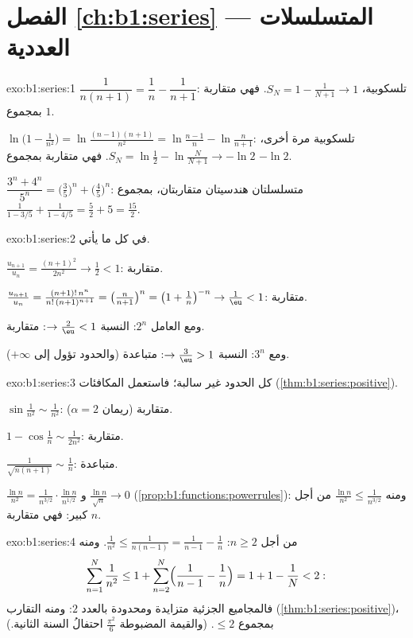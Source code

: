 \section*{الفصل \ref{ch:b1:series} --- المتسلسلات العددية}

\begin{solution}{exo:b1:series:1}
$\dfrac{1}{n(n+1)} = \dfrac1n - \dfrac{1}{n+1}$: تلسكوبية، $S_N =
1 - \frac{1}{N+1} \to 1$. فهي متقاربة بمجموع $1$.

$\ln\bigl(1 - \frac{1}{n^2}\bigr) = \ln\frac{(n-1)(n+1)}{n^2} =
\ln\frac{n-1}{n} - \ln\frac{n}{n+1}$: تلسكوبية مرة أخرى، $S_N =
\ln\frac12 - \ln\frac{N}{N+1} \to -\ln 2$. فهي متقاربة بمجموع $-\ln 2$.

$\dfrac{3^n + 4^n}{5^n} = \bigl(\frac35\bigr)^n +
\bigl(\frac45\bigr)^n$: متسلسلتان هندسيتان متقاربتان، بمجموع
$\frac{1}{1 - 3/5} + \frac{1}{1 - 4/5} = \frac52 + 5 = \frac{15}{2}$.
\end{solution}

\begin{solution}{exo:b1:series:2}
 في كل ما يأتي.

$\frac{u_{n+1}}{u_n} = \frac{(n+1)^2}{2n^2} \to \frac12 < 1$:
متقاربة.

$\frac{u_{n+1}}{u_n} = \frac{(n+1)!\,n^n}{n!\,(n+1)^{n+1}} =
\bigl(\frac{n}{n+1}\bigr)^n = \bigl(1 + \frac1n\bigr)^{-n} \to
\frac1\eu < 1$: متقاربة.

ومع العامل $2^n$: النسبة $\to \frac2\eu < 1$: متقاربة.

ومع $3^n$: النسبة $\to \frac3\eu > 1$: متباعدة (والحدود تؤول إلى
$+\infty$).
\end{solution}

\begin{solution}{exo:b1:series:3}
كل الحدود غير سالبة؛ فاستعمل المكافئات
(\cref{thm:b1:series:positive}).

$\sin\frac{1}{n^2} \sim \frac{1}{n^2}$: متقاربة (ريمان $\alpha
= 2$).

$1 - \cos\frac1n \sim \frac{1}{2n^2}$: متقاربة.

$\frac{1}{\sqrt{n(n+1)}} \sim \frac1n$: متباعدة.

$\frac{\ln n}{n^2} = \frac{1}{n^{3/2}}\cdot\frac{\ln n}{n^{1/2}}$
و $\frac{\ln n}{\sqrt n} \to 0$
(\cref{prop:b1:functions:powerrules}): ومنه $\frac{\ln n}{n^2} \leq
\frac{1}{n^{3/2}}$ من أجل $n$ كبير: فهي متقاربة.
\end{solution}

\begin{solution}{exo:b1:series:4}
من أجل $n \geq 2$: $\frac{1}{n^2} \leq \frac{1}{n(n-1)} =
\frac{1}{n-1} - \frac1n$. ومنه
\[
\sum_{n=1}^{N} \frac{1}{n^2} \leq 1 + \sum_{n=2}^{N}
\Bigl(\frac{1}{n-1} - \frac1n\Bigr) = 1 + 1 - \frac1N < 2 :
\]
فالمجاميع الجزئية متزايدة ومحدودة بالعدد $2$: ومنه التقارب
(\cref{thm:b1:series:positive})، بمجموع $\leq 2$. (والقيمة المضبوطة
$\frac{\pi^2}{6}$ احتفالُ السنة الثانية.)
\end{solution}

